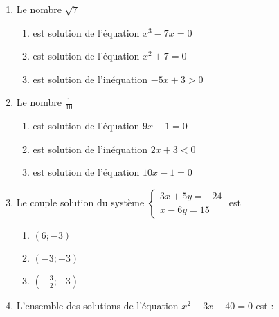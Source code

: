 \documentclass[oneside,twoside]{book}
\begin{document}
\begin{enumerate}
\begin{enumerate}
\end{enumerate}



\item Le nombre $\sqrt{7}$

\begin{enumerate}

\item\BonneReponse est solution de l'équation $x^{3}-7x=0$
\item\MauvaiseReponse est solution de l'équation $x^{2}+7=0$


\item\MauvaiseReponse est solution de l'inéquation $-5x+3>0$

\end{enumerate}



\item Le nombre $\frac{1}{10}$

\begin{enumerate}

\item\MauvaiseReponse est solution de l'équation $9x+1=0$


\item\MauvaiseReponse est solution de l'inéquation $2x+3<0$
\item\BonneReponse est solution de l'équation $10x-1=0$

\end{enumerate}

\newpage

\item Le couple solution du système $\left\{\begin{array}{c}3x+5y=-24 \\ x-6y=15\end{array}\right.$ est

\begin{enumerate}

\item\MauvaiseReponse $(6;-3)$

\item\BonneReponse $(-3 ;-3)$
\item\MauvaiseReponse $(-\frac{3}{2} ; -3)$


\end{enumerate}




\item L'ensemble des solutions de l'équation $x^{2}+3 x-40=0$ est :


\end{enumerate}
\end{document}
